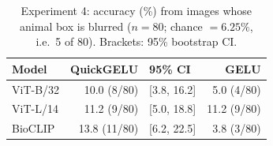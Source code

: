 \begin{table}[t]
\caption{Experiment 4: accuracy (\%) from images whose animal box is blurred ($n{=}80$; chance $=6.25\%$, i.e.\ 5 of 80). Brackets: 95\% bootstrap CI.}
\label{tab:bg}
\centering\footnotesize
\setlength{\tabcolsep}{4pt}
\begin{tabular}{l rl r}
\toprule
Model & QuickGELU & 95\% CI & GELU \\
\midrule
ViT-B/32 & 10.0 (8/80) & [3.8, 16.2] & 5.0 (4/80) \\
ViT-L/14 & 11.2 (9/80) & [5.0, 18.8] & 11.2 (9/80) \\
BioCLIP & 13.8 (11/80) & [6.2, 22.5] & 3.8 (3/80) \\
\bottomrule
\end{tabular}
\end{table}
